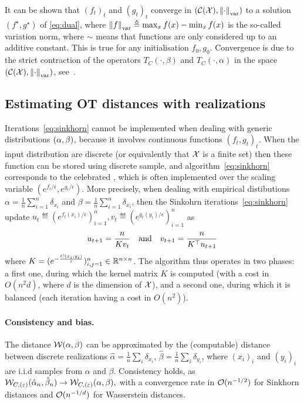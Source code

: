 It can be shown that ${(f_t)}_t$ and ${(g_t)}_t$ converge in $(\mathcal{C}(\mathcal{X}),
\left\| \cdot \right\|_{\text{var}})$ to a solution $(f^\star, g^\star)$ of
\eqref{eq:dual}, where $\left\| f \right\|_{\text{var}} \triangleq \max_x f(x) - \min_x f(x)$ is
the so-called variation norm, where $\sim$ means that functions are only considered up to an additive constant. This is true for any initialisation 
$f_0, g_0$.  Convergence is due to the strict contraction of the operators $T_C(\cdot, \beta)$ and
$T_{C}(\cdot, \alpha)$ in the space $(\mathcal{C}(\mathcal{X}), \left\| \cdot \right\|_{\text{var}})$, see~\cite{peyre2019computational}.

\subsection{Estimating OT distances with realizations}

Iterations~\eqref{eq:sinkhorn} cannot be implemented when dealing with generic distributions $(\alpha,\beta)$, because it involves continuous functions ${(f_t,g_t)}_t$. 
%
When the input distribution are discrete (or equivalently that $\mathcal{X}$ is a finite
set) then these function can be stored using discrete sample, and
algorithm~\eqref{eq:sinkhorn} corresponds to the celebrated
\citet{sinkhorn1967concerning}, which is often implemented over the scaling
variable $(e^{f_t/\epsilon},e^{g_t/\epsilon})$.
%
More precisely, when dealing with empirical distibutions $\alpha =
\frac{1}{n}\sum_{i=1}^n \delta_{x_i}$ and $\beta = \frac{1}{n} \sum_{i=1}^n
\delta_{x_i}$, then the Sinkohrn iterations~\eqref{eq:sinkhorn} update $u_t \eqdef
(e^{f_t(x_i)/\epsilon})_{i=1}^n, v_t \eqdef (e^{g_t(y_i)/\epsilon})_{i=1}^n$ as
\begin{equation*}
	u_{t+1} = \frac{n}{ K v_t }
	\quad \text{and} \quad
	v_{t+1} = \frac{n}{ K^\top u_{t+1} }
\end{equation*}
where $K=(e^{-\frac{C(x_i,y_i)}{\varepsilon}})_{i,j=1}^n \in \mathbb{R}^{n \times n}$. The algorithm thus operates in two
phases: a first one, during which the kernel matrix $K$ is computed (with a cost
in $O(n^2 d)$, where $d$ is the dimension of $\mathcal{X}$), and a second one, during
which it is balanced (each iteration having a cost in $O(n^2)$).


\paragraph{Consistency and bias.} The distance $\mathcal{W}(\alpha,\beta)$ can be
approximated by the (computable) distance between discrete realizations $\hat
\alpha = \frac{1}{n} \sum_i \delta_{x_i}$, $\hat \beta = \frac{1}{n} \sum_i
\delta_{y_i}$, where $(x_i)_i$ and $(y_i)_i$ are i.i.d samples from $\alpha$ and
$\beta$.  Consistency holds, as $\mathcal{W}_{C, (\varepsilon)}(\hat \alpha_n, \hat
\beta_n) \to \mathcal{W}_{C, (\varepsilon)}(\alpha, \beta),$ with a convergence rate in
$\mathcal{O}(n^{-1/2})$ for Sinkhorn distances and $\mathcal{O}(n^{-1/d})$ for Wasserstein
distances. 

